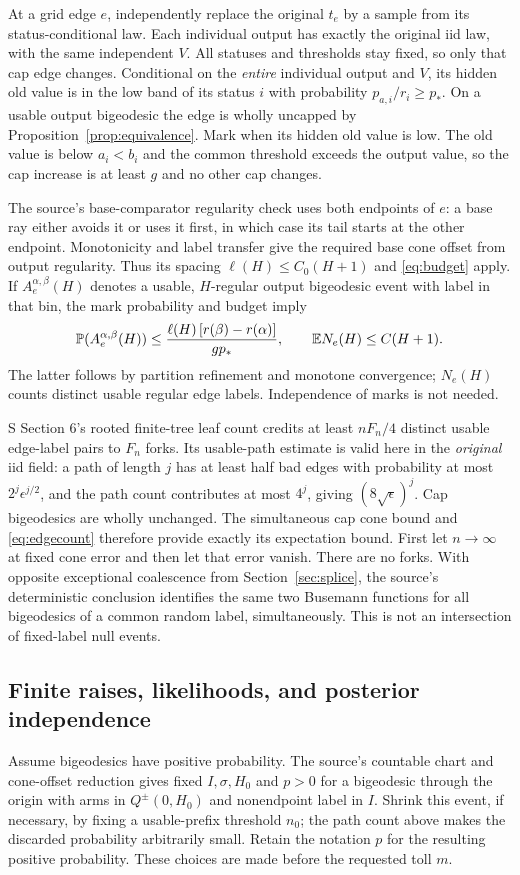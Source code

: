 At a grid edge $e$, independently replace the original $t_e$ by a sample
from its status-conditional law. Each individual output has exactly the
original iid law, with the same independent $V$. All statuses and thresholds
stay fixed, so only that cap edge changes. Conditional on the \emph{entire}
individual output and $V$, its hidden old value is in the low band of its
status $i$ with probability $p_{a,i}/r_i\ge p_*$. On a usable output
bigeodesic the edge is wholly uncapped by Proposition~\ref{prop:equivalence}.
Mark when its hidden old value is low. The old value is below $a_i<b_i$
and the common threshold exceeds the output value, so the cap increase
is at least $g$ and no other cap changes.

The source's base-comparator regularity check uses both endpoints of $e$:
a base ray either avoids it or uses it first, in which case its tail starts
at the other endpoint. Monotonicity and label transfer give the required
base cone offset from output regularity. Thus its spacing
$\ell(H)\le C_0(H+1)$ and \eqref{eq:budget} apply. If
$A_e^{\alpha,\beta}(H)$ denotes a usable, $H$-regular output bigeodesic
event with label in that bin, the mark probability and budget imply
\begin{equation}\label{eq:edgecount}
 \mathbb P(A_e^{\alpha,\beta}(H))
 \le\frac{\ell(H)\,[r(\beta)-r(\alpha)]}{g p_*},
 \qquad \mathbb E N_e(H)\le C(H+1).
\end{equation}
The latter follows by partition refinement and monotone convergence; $N_e(H)$
counts distinct usable regular edge labels. Independence of marks is not needed.

S Section 6's rooted finite-tree leaf count credits at least $nF_n/4$
distinct usable edge-label pairs to $F_n$ forks. Its usable-path estimate
is valid here in the \emph{original} iid field: a path of length $j$ has
at least half bad edges with probability at most $2^j\epsilon^{j/2}$,
and the path count contributes at most $4^j$, giving $(8\sqrt\epsilon)^j$.
Cap bigeodesics are wholly unchanged. The simultaneous cap cone bound
and \eqref{eq:edgecount} therefore provide exactly its expectation bound.
First let $n\to\infty$ at fixed cone error and then let that error vanish.
There are no forks. With opposite exceptional coalescence from
Section~\ref{sec:splice}, the source's deterministic conclusion identifies
the same two Busemann functions for all bigeodesics of a common random
label, simultaneously. This is not an intersection of fixed-label null events.

\subsection{Finite raises, likelihoods, and posterior independence}
Assume bigeodesics have positive probability. The source's countable chart
and cone-offset reduction gives fixed $I,\sigma,H_0$ and $p>0$ for a
bigeodesic through the origin with arms in $Q^\pm(0,H_0)$ and nonendpoint
label in $I$. Shrink this event, if necessary, by fixing a usable-prefix
threshold $n_0$; the path count above makes the discarded probability
arbitrarily small. Retain the notation $p$ for the resulting positive
probability. These choices are made before the requested toll $m$.

